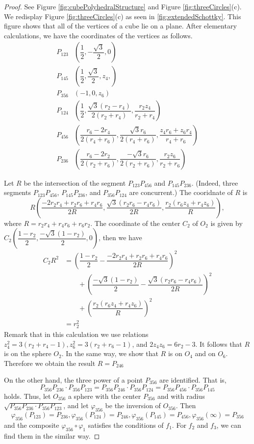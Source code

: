 \documentclass[suppldata, dvipdfmx]{interact}
\theoremstyle{plain}%
\theoremstyle{definition}
\theoremstyle{remark}
\theoremstyle{problemstyle}
\begin{document}
\begin{proof}
See Figure \ref{fig:cubePolyhedralStructure} and Figure \ref{fig:threeCircles}(c).  We redisplay Figure \ref{fig:threeCircles}(c) as seen in \ref{fig:extendedSchottky}.  This figure shows that all of the vertices of a cube lie on a plane.  After elementary calculations, we have the coordinates of the vertices as follows.
\begin{align*}
P_{123}&\left( \dfrac{1}{2}, -\dfrac{\sqrt{3}}{2} , 0 \right) \\
P_{145}&\left( \dfrac{1}{2}, \dfrac{\sqrt{3}}{2}, z_4 , \right) \\
P_{356}&\left( -1,  0, z_6\right) \\
P_{124}&\left( \dfrac{1}{2} , \dfrac{\sqrt{3}(r_2-r_4)}{2(r_2+r_4)}, \dfrac{r_2z_4}{r_2+r_4}\right) \\
P_{456}&\left(\dfrac{r_6-2r_4}{2(r_4+r_6)} , \dfrac{\sqrt{3}r_6}{2(r_4+r_6)} , \dfrac{z_4r_6+z_6r_4}{r_4+r_6}\right) \\
P_{236}&\left(\dfrac{r_6-2r_2}{2(r_2+r_6)} ,\dfrac{-\sqrt{3}r_6}{2(r_2+r_6)}  ,\dfrac{r_2z_6}{r_2+r_6} \right) 
\end{align*}

Let $R$ be the intersection of the segment $P_{123}P_{456}$ and $P_{145}P_{236}$.  (Indeed, three segments $P_{123}P_{456}$, $P_{145}P_{236}$, and $P_{356}P_{124}$ are concurrent.)  The cooridnate of $R$ is
\[
R\left(  \dfrac{-2r_2r_4+r_2r_6+r_4r_6}{2R}, \dfrac{\sqrt{3}(r_2r_6-r_4r_6)}{2R}, \dfrac{r_2(r_6z_4+r_4z_6)}{R}\right),
\]
where $R = r_2r_4 + r_4r_6 + r_6r_2.$  The coordinate of the center $C_2$ of $O_2$ is given by $C_2\left(\dfrac{1-r_2}{2}, \dfrac{-\sqrt{3}(1-r_2)}{2}, 0\right)$, then we have 
\begin{align*}
 {C_2R}^2 &= \left(\dfrac{1-r_2}{2} -  \dfrac{-2r_2r_4+r_2r_6+r_4r_6}{2R}\right ) ^2 \\
& \qquad + \left( \dfrac{-\sqrt{3}(1-r_2)}{2} - \dfrac{\sqrt{3}(r_2r_6-r_4r_6)}{2R} \right )^2 \\
& \qquad +\left( \dfrac{r_2(r_6z_4+r_4z_6)}{R} \right)^2 \\
&=r_2^2
\end{align*}
Remark that in this calculation we use relations $z_4^2 = 3(r_2 + r_4 - 1), 
z_6^2 = 3(r_2 + r_6 - 1)$, and $2z_4z_6 = 6r_2 - 3$.  It follows that $R$ is on the sphere $O_2$.  In the same way, we show that $R$ is on $O_4$ and on $O_6$.  Therefore we obtain the result $R=P_{246}$

On the other hand, the three power of a point $P_{356}$ are identified.  That is,
\[
P_{356}P_{236}\cdot P_{356}P_{123} = P_{356}P_{246}\cdot P_{356}P_{124} = P_{356}P_{456}\cdot P_{356}P_{145}
\]
holds.  Thus, let $O_{356}$ a sphere with the center $P_{356}$ and with radius $\sqrt{P_{356}P_{236}\cdot P_{356}P_{123}}$, and let $\varphi_{356}$ be the inversion of $O_{356}$.  Then   
\[
\varphi_{356}(P_{123})=P_{236}, \varphi_{356}(P_{124})=P_{246}, \varphi_{356}(P_{145})=P_{456}, \varphi_{356}(\infty)=P_{356}
\]
and the composite $\varphi_{356}\circ\varphi_1$ satisfies the conditions of $f_1$.  For $f_2$ and $f_3$, we can find them in the similar way.
\end{proof}
\end{document}
